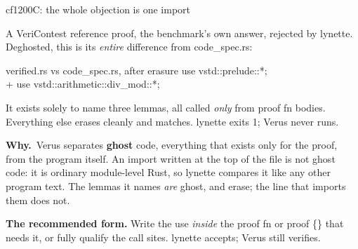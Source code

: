 \documentclass[aspectratio=169,10pt]{beamer}
\newcommand{\code}[1]{{\ttfamily #1}}
\newcommand{\hd}[1]{\textbf{\color{lgTeal}#1}}
\begin{document}
\begin{frame}[fragile]{cf1200C: the whole objection is one import}

{\scriptsize
A VeriContest reference proof, the benchmark's own answer, rejected by lynette. Deghosted,
this is its \emph{entire} difference from \code{code\_spec.rs}:
}

\vspace{4pt}
\begin{center}
\begin{minipage}{0.58\linewidth}
\begin{codebox}[lgRed]{\code{verified.rs} vs \code{code\_spec.rs}, after erasure}
{\ttfamily\scriptsize
\phantom{+ }use vstd::prelude::*;\\
{\color{lgGreen}+ }use vstd::arithmetic::div\_mod::*;
}
\end{codebox}
\end{minipage}
\end{center}

\vspace{3pt}
{\scriptsize
It exists solely to name three lemmas, all called \emph{only} from \code{proof fn} bodies.
Everything else erases cleanly and matches. lynette exits 1; Verus never runs.
}

\vspace{5pt}
{\scriptsize
\hd{Why.}\ Verus separates \textbf{ghost} code, everything that exists only for the
proof, from the program itself. An import written at the top of the file is not ghost code: it
is ordinary module-level Rust, so lynette compares it like any other program text. The lemmas it
names \emph{are} ghost, and erase; the line that imports them does not.
}

\vspace{4pt}
\begin{callout}[lgGreen]
\scriptsize
\textbf{The recommended form.} Write the \code{use} \emph{inside} the \code{proof fn} or
\code{proof \{\}} that needs it, or fully qualify the call sites. lynette accepts; Verus still
verifies.
\end{callout}

\end{frame}
\end{document}
